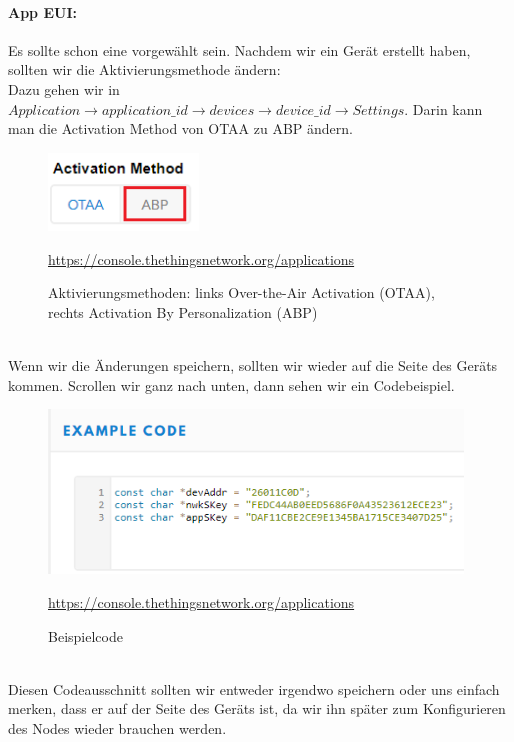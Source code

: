 \paragraph{App EUI:} Es sollte schon eine vorgewählt sein. Nachdem wir ein Gerät erstellt haben, sollten wir die Aktivierungsmethode ändern:\\
Dazu gehen wir in $Application \rightarrow application\_id \rightarrow devices \rightarrow device\_id \rightarrow Settings$. Darin kann man die Activation Method von OTAA zu ABP ändern.
\begin{figure}[ht]
    \center
    \includegraphics[width=4cm]{Bilder/lora-6.png}\\
    \caption{Aktivierungsmethoden: links Over-the-Air Activation (OTAA), rechts Activation By Personalization (ABP)}
    \begin{center} \quelle\url{https://console.thethingsnetwork.org/applications} \end{center}
\end{figure}\\
Wenn wir die Änderungen speichern, sollten wir wieder auf die Seite des Geräts kommen. Scrollen wir ganz nach unten, dann sehen wir ein Codebeispiel.
\begin{figure}[ht]
    \center
    \includegraphics[width=11cm]{Bilder/lora-7.png}\\
    \caption{Beispielcode}
    \begin{center} \quelle\url{https://console.thethingsnetwork.org/applications} \end{center}
    \label{fig:beispielcode}
\end{figure}\\
Diesen Codeausschnitt sollten wir entweder irgendwo speichern oder uns einfach merken, dass er auf der Seite des Geräts ist, da wir ihn später zum Konfigurieren des Nodes wieder brauchen werden. 
